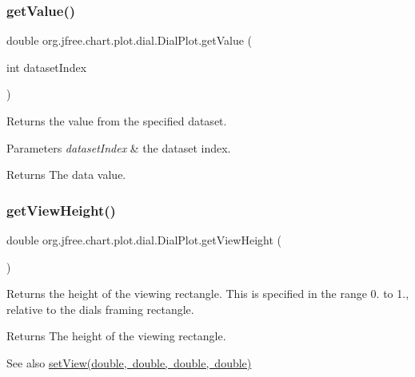 \subsubsection{\texorpdfstring{get\+Value()}{getValue()}}
{\footnotesize\ttfamily double org.\+jfree.\+chart.\+plot.\+dial.\+Dial\+Plot.\+get\+Value (\begin{DoxyParamCaption}\item[{int}]{dataset\+Index }\end{DoxyParamCaption})}

Returns the value from the specified dataset.


\begin{DoxyParams}{Parameters}
{\em dataset\+Index} & the dataset index.\\
\hline
\end{DoxyParams}
\begin{DoxyReturn}{Returns}
The data value. 
\end{DoxyReturn}
\mbox{\label{classorg_1_1jfree_1_1chart_1_1plot_1_1dial_1_1_dial_plot_af906c91830e899e4a55d53defc5275ed}} 
\subsubsection{\texorpdfstring{get\+View\+Height()}{getViewHeight()}}
{\footnotesize\ttfamily double org.\+jfree.\+chart.\+plot.\+dial.\+Dial\+Plot.\+get\+View\+Height (\begin{DoxyParamCaption}{ }\end{DoxyParamCaption})}

Returns the height of the viewing rectangle. This is specified in the range 0. to 1., relative to the dial\textquotesingle{}s framing rectangle.

\begin{DoxyReturn}{Returns}
The height of the viewing rectangle.
\end{DoxyReturn}
\begin{DoxySeeAlso}{See also}
\mbox{\hyperlink{classorg_1_1jfree_1_1chart_1_1plot_1_1dial_1_1_dial_plot_ac66e780fbd6679eed711805ba1d47d77}{set\+View(double, double, double, double)}} 
\end{DoxySeeAlso}
\mbox{\label{classorg_1_1jfree_1_1chart_1_1plot_1_1dial_1_1_dial_plot_a5ab34623394c29066755f6d0f9759510}} 
